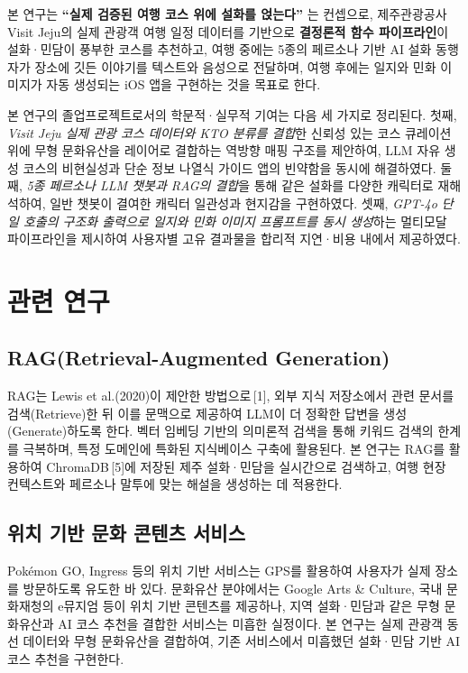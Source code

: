 \documentclass[10pt,twocolumn,a4paper]{article}
\begin{document}
본 연구는 \textbf{``실제 검증된 여행 코스 위에 설화를 얹는다''} 는 컨셉으로,
제주관광공사 Visit Jeju의 실제 관광객 여행 일정 데이터를 기반으로 \textbf{결정론적
함수 파이프라인}이 설화·민담이 풍부한 코스를 추천하고, 여행
중에는 5종의 페르소나 기반 AI 설화 동행자가 장소에 깃든 이야기를 텍스트와
음성으로 전달하며, 여행 후에는 일지와 민화 이미지가 자동 생성되는 iOS 앱을
구현하는 것을 목표로 한다.

본 연구의 졸업프로젝트로서의 학문적·실무적 기여는 다음 세 가지로 정리된다.
첫째, \emph{Visit Jeju 실제 관광 코스 데이터와 KTO 분류를 결합}한 신뢰성
있는 코스 큐레이션 위에 무형 문화유산을 레이어로 결합하는 역방향 매핑
구조를 제안하여, LLM 자유 생성 코스의 비현실성과 단순 정보 나열식 가이드
앱의 빈약함을 동시에 해결하였다. 둘째, \emph{5종 페르소나 LLM 챗봇과 RAG의
결합}을 통해 같은 설화를 다양한 캐릭터로 재해석하여, 일반 챗봇이 결여한
캐릭터 일관성과 현지감을 구현하였다. 셋째, \emph{GPT-4o 단일 호출의 구조화
출력으로 일지와 민화 이미지 프롬프트를 동시 생성}하는 멀티모달 파이프라인을
제시하여 사용자별 고유 결과물을 합리적 지연·비용 내에서 제공하였다.

\section{관련 연구}

\subsection{RAG(Retrieval-Augmented Generation)}

RAG는 Lewis et al.(2020)이 제안한 방법으로\,[1], 외부 지식 저장소에서 관련
문서를 검색(Retrieve)한 뒤 이를 문맥으로 제공하여 LLM이 더 정확한 답변을
생성(Generate)하도록 한다. 벡터 임베딩 기반의 의미론적 검색을 통해 키워드
검색의 한계를 극복하며, 특정 도메인에 특화된 지식베이스 구축에 활용된다.
본 연구는 RAG를 활용하여 ChromaDB\,[5]에 저장된 제주 설화·민담을 실시간으로
검색하고, 여행 현장 컨텍스트와 페르소나 말투에 맞는 해설을 생성하는 데
적용한다.

\subsection{위치 기반 문화 콘텐츠 서비스}

Pok\'{e}mon GO, Ingress 등의 위치 기반 서비스는 GPS를 활용하여 사용자가
실제 장소를 방문하도록 유도한 바 있다. 문화유산 분야에서는 Google Arts \&
Culture, 국내 문화재청의 e뮤지엄 등이 위치 기반 콘텐츠를 제공하나, 지역
설화·민담과 같은 무형 문화유산과 AI 코스 추천을 결합한 서비스는 미흡한
실정이다. 본 연구는 실제 관광객 동선 데이터와 무형 문화유산을 결합하여,
기존 서비스에서 미흡했던 설화·민담 기반 AI 코스 추천을 구현한다.
\end{document}
